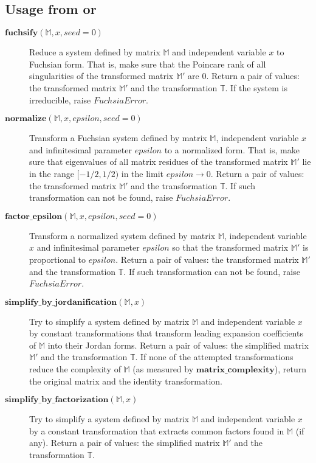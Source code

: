 \documentclass[12pt,a4paper]{article}
\def\F#1{\mathbf{#1}} %
\def\M#1{\mathbb{#1}} %
\def\functionitem#1#2{\item[$\F{#1}(#2)$]}
\begin{document}
\subsection{Usage from \sage or \python}

\begin{description}

\functionitem{fuchsify}{\M M, x, seed=0}
Reduce a system defined by matrix $\M M$ and independent variable
$x$ to Fuchsian form. That is, make sure that the Poincare rank
of all singularities of the transformed matrix $\M M'$ are
$0$. Return a pair of values: the transformed matrix $\M M'$
and the transformation $\M T$. If the system is irreducible,
raise $FuchsiaError$.

\functionitem{normalize}{\M M, x, epsilon, seed=0}
Transform a Fuchsian system defined by matrix $\M M$, independent
variable $x$ and infinitesimal parameter $epsilon$ to a normalized
form. That is, make sure that eigenvalues of all matrix residues
of the transformed matrix $\M M'$ lie in the range $[-1/2, 1/2)$
in the limit $epsilon\to0$. Return a pair of values: the
transformed matrix $\M M'$ and the transformation $\M T$. If
such transformation can not be found, raise $FuchsiaError$.

\functionitem{factor\_epsilon}{\M M, x, epsilon, seed=0}
Transform a normalized system defined by matrix $\M M$, independent
variable $x$ and infinitesimal parameter $epsilon$ so that the
transformed matrix $\M M'$ is proportional to $epsilon$. Return a
pair of values: the transformed matrix $\M M'$ and the transformation
$\M T$. If such transformation can not be found, raise $FuchsiaError$.

\functionitem{simplify\_by\_jordanification}{\M M, x}
Try to simplify a system defined by matrix $\M M$ and independent
variable $x$ by constant transformations that transform leading
expansion coefficients of $\M M$ into their Jordan forms. Return a
pair of values: the simplified matrix $\M M'$ and the transformation
$\M T$. If none of the attempted transformations reduce the
complexity of $\M M$ (as measured by $\F{matrix\_complexity}$),
return the original matrix and the identity transformation.

\functionitem{simplify\_by\_factorization}{\M M, x}
Try to simplify a system defined by matrix $\M M$ and independent
variable $x$ by a constant transformation that extracts common
factors found in $\M M$ (if any). Return a pair of values:
the simplified matrix $\M M'$ and the transformation $\M T$.


\end{description}
\end{document}
